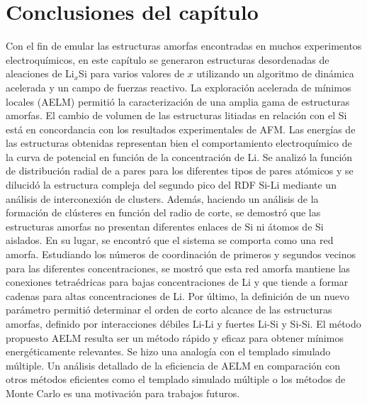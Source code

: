 \section{Conclusiones del capítulo}

Con el fin de emular las estructuras amorfas encontradas en muchos experimentos 
electroquímicos, en este capítulo se generaron estructuras desordenadas de 
aleaciones de Li$_x$Si para varios valores de $x$ utilizando un algoritmo de 
dinámica acelerada y un campo de fuerzas reactivo. La exploración acelerada de 
mínimos locales (AELM) permitió la caracterización de una amplia gama de 
estructuras amorfas. El cambio de volumen de las estructuras litiadas en relación 
con el Si está en concordancia con los resultados experimentales de AFM. Las
energías de las estructuras obtenidas representan bien el comportamiento 
electroquímico de la curva de potencial en función de la concentración de Li. Se 
analizó la función de distribución radial de a pares para los diferentes tipos de 
pares atómicos y se dilucidó la estructura compleja del segundo pico del RDF 
Si-Li mediante un análisis de interconexión de clusters. Además, haciendo un 
análisis de la formación de clústeres en función del radio de corte, se demostró 
que las estructuras amorfas no presentan diferentes enlaces de Si ni átomos de Si 
aislados. En su lugar, se encontró que el sistema se comporta como una red amorfa. 
Estudiando los números de coordinación de primeros y segundos vecinos para las 
diferentes concentraciones, se mostró que esta red amorfa mantiene las conexiones 
tetraédricas para bajas concentraciones de Li y que tiende a formar cadenas para 
altas concentraciones de Li. Por último, la definición de un nuevo parámetro 
permitió determinar el orden de corto alcance de las estructuras amorfas, definido 
por interacciones débiles Li-Li y fuertes Li-Si y Si-Si. El método propuesto AELM 
resulta ser un método rápido y eficaz para obtener mínimos energéticamente 
relevantes. Se hizo una analogía con el templado simulado múltiple. Un análisis 
detallado de la eficiencia de AELM en comparación con otros métodos eficientes 
como el templado simulado múltiple o los métodos de Monte Carlo es una motivación 
para trabajos futuros.
